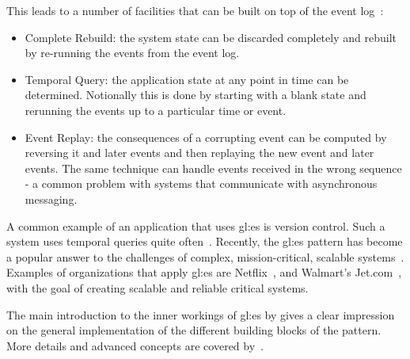 This leads to a number of facilities that can be built on top of the event log~\citep{fowleres}:

\begin{itemize}
  \item Complete Rebuild: the system state can be discarded completely and rebuilt by re-running the events from the event log.
  \item Temporal Query: the application state at any point in time can be determined. Notionally this is done by starting with a blank state and rerunning the events up to a particular time or event.
  \item Event Replay: the consequences of a corrupting event can be computed by reversing it and later events and then replaying the new event and later events. The same technique can handle events received in the wrong sequence - a common problem with systems that communicate with asynchronous messaging.
\end{itemize}

A common example of an application that uses \gls{gl:es} is version control. Such a system uses temporal queries quite often~\citep{fowleres}. Recently, the \gls{gl:es} pattern has become a popular answer to the challenges of complex, mission-critical, scalable systems~\citep{OVEREEM2021110970}. Examples of organizations that apply \gls{gl:es} are Netflix~\citep{avery2017scaling}, and Walmart’s Jet.com~\citep{jet2017scaling}, with the goal of creating scalable and reliable critical systems.

The main introduction to the inner workings of \gls{gl:es} by \citep{fowleres} gives a clear impression on the general implementation of the different building blocks of the pattern. More details and advanced concepts are covered by~\citep{richardson2018microservices}.

\pagebreak



